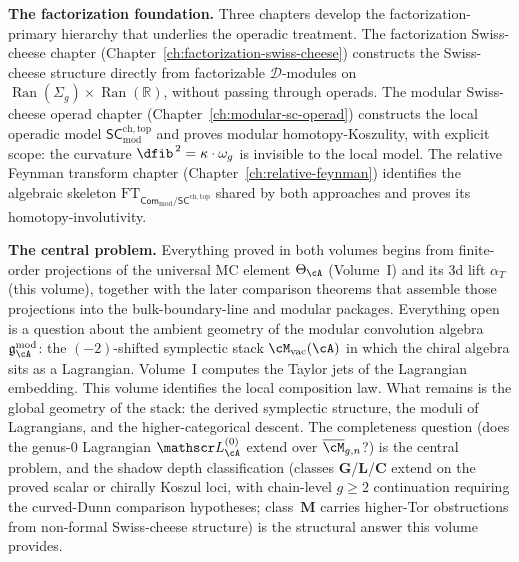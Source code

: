 \medskip\noindent\textbf{The factorization foundation.}\enspace
Three chapters develop the factorization-primary hierarchy that
underlies the operadic treatment. The factorization Swiss-cheese
chapter (Chapter~\ref{ch:factorization-swiss-cheese}) constructs
the Swiss-cheese structure directly from factorizable
$\mathcal D$-modules on $\operatorname{Ran}(\Sigma_g) \times
\operatorname{Ran}(\mathbb R)$, without passing through operads.
The modular Swiss-cheese operad chapter
(Chapter~\ref{ch:modular-sc-operad}) constructs the local operadic
model $\mathsf{SC}^{\mathrm{ch,top}}_{\mathrm{mod}}$ and proves
modular homotopy-Koszulity, with explicit scope: the curvature
$\dfib^{\,2} = \kappa \cdot \omega_g$ is invisible to the local
model. The relative Feynman transform chapter
(Chapter~\ref{ch:relative-feynman}) identifies the algebraic
skeleton $\mathrm{FT}_{\mathsf{Com}_{\mathrm{mod}} /
\mathsf{SC}^{\mathrm{ch,top}}}$ shared by both approaches and
proves its homotopy-involutivity.

\medskip\noindent\textbf{The central problem.}\enspace
Everything proved in both volumes begins from finite-order projections
of the universal MC element $\Theta_\cA$ (Volume~I) and its $3$d lift
$\alpha_T$ (this volume), together with the later comparison theorems
that assemble those projections into the bulk-boundary-line
and modular packages. Everything open is a question about the
ambient geometry of the modular convolution algebra
$\mathfrak{g}^{\mathrm{mod}}_\cA$: the $(-2)$-shifted symplectic
stack $\cM_{\mathrm{vac}}(\cA)$ in which the chiral algebra sits as a
Lagrangian. Volume~I computes the Taylor jets of the Lagrangian
embedding. This volume identifies the local composition law. What
remains is the global geometry of the stack: the derived symplectic
structure, the moduli of Lagrangians, and the higher-categorical
descent. The completeness question (does the genus-$0$ Lagrangian
$\cL_\cA^{(0)}$ extend over $\overline{\cM}_{g,n}$?) is the
central problem, and the shadow depth classification (classes
$\mathbf{G}$/$\mathbf{L}$/$\mathbf{C}$ extend on the proved scalar or
chirally Koszul loci, with chain-level $g \ge 2$ continuation requiring
the curved-Dunn comparison hypotheses; class~$\mathbf{M}$ carries
higher-Tor obstructions from non-formal Swiss-cheese structure) is the
structural answer this volume provides.

